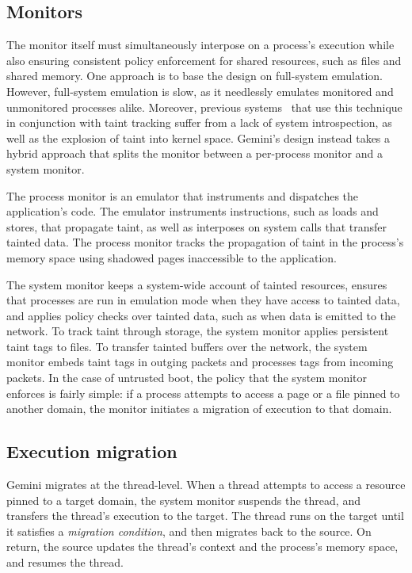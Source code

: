 \subsection{Monitors}
%
The monitor itself must simultaneously interpose on a process's execution while
also ensuring consistent policy enforcement for shared resources, such as files
and shared memory.
%
One approach is to base the design on full-system emulation.
%
However, full-system emulation is slow, as it needlessly emulates
monitored and unmonitored processes alike.
%
Moreover, previous
systems~\cite{whole-system-simulation,panorama,demand-emulation} that use this
technique in conjunction with taint tracking suffer from a lack of system
introspection, as well as the explosion of taint into kernel space.
%
Gemini's design instead takes a hybrid approach that splits the monitor between a
per-process monitor and a system monitor.



%
The process monitor is an emulator that instruments and dispatches the
application's code.
%
The emulator instruments instructions, such as
loads and stores, that propagate taint, as well as interposes on
system calls that transfer tainted data.
%
The process monitor tracks the propagation of taint in the process's
memory space using shadowed pages inaccessible to the application.


The system monitor keeps a system-wide account of tainted resources,
ensures that processes are run in emulation mode when they have access to
tainted data, and applies policy checks over tainted data, such as when data is
emitted to the network.
%
To track taint through storage, the system monitor applies persistent
taint tags to files.
%
To transfer tainted buffers over the network, the system monitor embeds taint
tags in outging packets and processes tags from incoming packets.
%
In the case of untrusted boot, the policy that the system monitor enforces is
fairly simple: if a process attempts to access a page or a file pinned to
another domain, the monitor initiates a migration of execution to that domain.


\subsection{Execution migration}

Gemini migrates at the thread-level.
%
When a thread attempts to access a resource pinned to a target domain,
the system monitor suspends the thread, and transfers the
thread's execution to the target.
%
The thread runs on the target until it satisfies a \emph{migration condition},
and then migrates back to the source.
%
On return, the source updates the thread's context and the process's memory
space, and resumes the thread.


